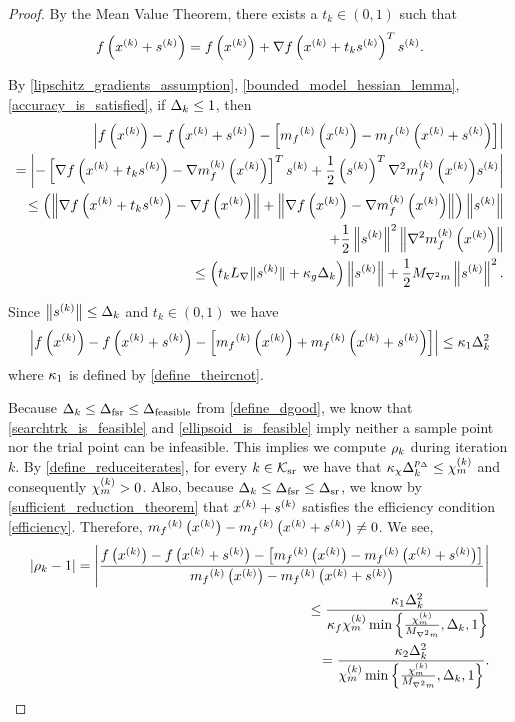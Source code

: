 \begin{proof}
By the Mean Value Theorem, there exists a $t_k \in (0, 1)$ such that
\begin{align*}
f\left(x^{(k)} + {{s}^{(k)}}\right) = f\left(x^{(k)}\right) + \nabla f\left(x^{(k)} + t_k{{s}^{(k)}}\right)^T{{s}^{(k)}}.
\end{align*}

By \cref{lipschitz_gradients_assumption}, \cref{bounded_model_hessian_lemma}, \cref{accuracy_is_satisfied}, if $\Delta_k \le 1$, then
\begin{align*}
\left|f\left(x^{(k)}\right) - f\left(x^{(k)} + {{s}^{(k)}}\right) - \left[{{m}_f}^{(k)}\left(x^{(k)}\right) - {{m}_f}^{(k)}\left(x^{(k)} + {{s}^{(k)}}\right)\right]\right| \\
= \left|-\left[\nabla f\left(x^{(k)} + t_k{{s}^{(k)}}\right) - {\nabla m_f^{(k)}\left(x^{(k)}\right)}\right]^T{{s}^{(k)}} + \frac 1 2 \left({{s}^{(k)}}\right)^T {\nabla^2m_f^{(k)}\left(x^{(k)}\right)} {{s}^{(k)}}\right| \\
\le \left(\left\| \nabla f\left(x^{(k)} + t_k{{s}^{(k)}}\right) - \nabla f\left(x^{(k)}\right) \right\| 
+ \left\| \nabla f\left(x^{(k)}\right)-{\nabla m_f^{(k)}\left(x^{(k)}\right)} \right\|\right) \left\|{{s}^{(k)}}\right\| \\
+ \frac 1 2 \left\|{{s}^{(k)}}\right\|^2\left\|{\nabla^2m_f^{(k)}\left(x^{(k)}\right)}\right\| \\
\le \left(t_k {L_{\nabla}} \|{{s}^{(k)}}\| + \kappa_{g}\Delta_k\right) \left\|{{s}^{(k)}}\right\| + \frac 1 2 {M_{\nabla^2 m}} \left\|{{s}^{(k)}}\right\|^2.
\end{align*}

Since $\left\| {{s}^{(k)}} \right\| \le \Delta_k$ and $t_k \in (0, 1)$ we have
\begin{align*}
\left|f\left(x^{(k)}\right) - f\left(x^{(k)} + {{s}^{(k)}}\right) - \left[{{m}_f}^{(k)}\left(x^{(k)}\right) + {{m}_f}^{(k)}\left(x^{(k)} + {{s}^{(k)}}\right)\right]\right| \le {\kappa_1} \Delta_k^2
\end{align*}
where ${\kappa_1}$ is defined by \cref{define_theircnot}.

Because $\Delta_k \le \Delta_{\textrm{fsr}} \le {\Delta_{\textrm{feasible}}}$ from \cref{define_dgood}, 
we know that
\cref{searchtrk_is_feasible} and \cref{ellipsoid_is_feasible} imply neither a sample point nor the trial point can be infeasible.
This implies we compute $\rho_k$ during iteration $k$.
By \cref{define_reduceiterates}, for every $k \in {\mathcal K_{\textrm{sr}}}$ we have that $\kappa_{\chi}\Delta_k^{p_{\Delta}} \le {\chi_m^{(k)}}$ and consequently ${\chi_m^{(k)}} > 0$.
Also, because $\Delta_k \le \Delta_{\textrm{fsr}} \le {\Delta_{\textrm{sr}}}$, we know by \cref{sufficient_reduction_theorem} that $x^{(k)} + {{s}^{(k)}}$ satisfies the efficiency condition \cref{efficiency}.
Therefore, ${{m}_f}^{(k)}\left(x^{(k)}\right) - {{m}_f}^{(k)}\left(x^{(k)} + {{s}^{(k)}}\right) \ne 0$.
We see,
\begin{align*}
\left|\rho_k - 1\right| 
= \left|\frac
{f\left(x^{(k)}\right) - f\left(x^{(k)} + {{s}^{(k)}}\right) - \left[{{m}_f}^{(k)}\left(x^{(k)}\right) - {{m}_f}^{(k)}\left(x^{(k)} + {{s}^{(k)}}\right)\right]}
{{{m}_f}^{(k)}\left(x^{(k)}\right) - {{m}_f}^{(k)}\left(x^{(k)} + {{s}^{(k)}}\right)} \right| \\
\le \frac {{\kappa_1} \Delta_k^2} {\kappa_f {\chi_m^{(k)}} \min\left\{\frac{{\chi_m^{(k)}}}{{M_{\nabla^2 m}}}, \Delta_k, 1\right\}} \\
= \frac {{\kappa_2} \Delta_k^2} {{\chi_m^{(k)}} \min\left\{\frac{{\chi_m^{(k)}}}{{M_{\nabla^2 m}}}, \Delta_k, 1\right\}}.
\end{align*}


\end{proof}
